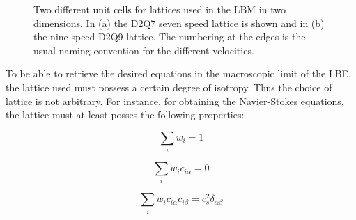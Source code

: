 \begin{figure}
  \centering
  \hspace{15pt} 
  \caption{Two different unit cells for lattices used in the LBM in two
    dimensions. In (a) the D2Q7 seven speed lattice is shown and in
    (b) the nine speed D2Q9 lattice. The numbering at the edges is the
    usual naming convention for the different velocities.}
  \label{fig:lbm:lattices}
\end{figure}
 
To be able to retrieve the desired equations in the macroscopic limit
of the LBE, the lattice used must possess a certain degree of
isotropy. Thus the choice of lattice is not arbitrary. For instance,
for obtaining the Navier-Stokes equations, the lattice must at least
posses the following properties:

\begin{equation}\label{eq:lbm:i1}
\sum_i w_i = 1
\end{equation} 

\begin{equation}\label{eq:lbm:i2}
\sum_i w_ic_{i\alpha} = 0
\end{equation}

\begin{equation}\label{eq:lbm:i3}
\sum_i w_ic_{i\alpha}c_{i\beta} = c_s^2\delta_{\alpha \beta}
\end{equation}

